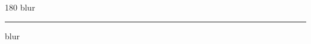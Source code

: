 
\begin{frame}
\begin{center}
\begin{turn}{180}
{\fontsize{2.5cm}{1em}\selectfont blur}
\end{turn}
\vspace{1em}\par  
\hrule
\vspace{1em}\par  
{\fontsize{2.5cm}{1em}\selectfont blur}
\end{center}
\end{frame}
